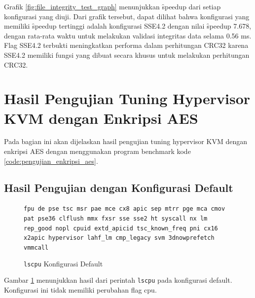 Grafik \ref{fig:file_integrity_test_graph} menunjukkan \f{speedup} dari setiap konfigurasi yang diuji. Dari grafik tersebut, dapat dilihat bahwa konfigurasi yang memiliki \f{speedup} tertinggi adalah konfigurasi SSE4.2 dengan nilai \f{speedup} 7.678, dengan rata-rata waktu untuk melakukan validasi integritas data selama 0.56 ms. Flag SSE4.2 terbukti meningkatkan performa dalam perhitungan CRC32 karena SSE4.2 memiliki fungsi yang dibuat secara khusus untuk melakukan perhitungan CRC32.

\section{Hasil Pengujian Tuning Hypervisor KVM dengan Enkripsi AES}
Pada bagian ini akan dijelaskan hasil pengujian tuning hypervisor KVM dengan enkripsi AES dengan menggunakan program benchmark kode \ref{code:pengujian_enkripsi_aes}.

\subsection{Hasil Pengujian dengan Konfigurasi Default}
\begin{figure}
    \texttt{fpu de pse tsc msr pae mce cx8 apic sep mtrr pge mca cmov pat pse36 clflush mmx fxsr sse sse2 ht syscall nx lm rep\_good nopl cpuid extd\_apicid tsc\_known\_freq pni cx16 x2apic hypervisor lahf\_lm cmp\_legacy svm 3dnowprefetch vmmcall}
    \caption{\texttt{lscpu} Konfigurasi Default}
    \label{fig:lscpu_aes_test_default}
\end{figure}

Gambar \ref{fig:lscpu_aes_test_default} menunjukkan hasil dari perintah \texttt{lscpu} pada konfigurasi default. Konfigurasi ini tidak memiliki perubahan flag cpu.

